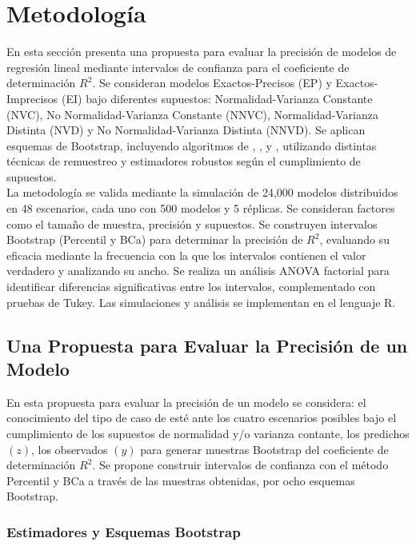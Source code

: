 \section{Metodología}
En esta sección presenta una propuesta para evaluar la precisión de modelos de regresión lineal mediante intervalos de confianza para el coeficiente de determinación \(R^2\). Se consideran modelos Exactos-Precisos (EP) y Exactos-Imprecisos (EI) bajo diferentes supuestos: Normalidad-Varianza Constante (NVC), No Normalidad-Varianza Constante (NNVC), Normalidad-Varianza Distinta (NVD) y No Normalidad-Varianza Distinta (NNVD). Se aplican esquemas de Bootstrap, incluyendo algoritmos de \textcite{wu-1986}, \textcite{liu-1988}, \textcite{zacarias-2023} y \textcite{balam-2012}, utilizando distintas técnicas de remuestreo y estimadores robustos según el cumplimiento de supuestos.\\

La metodología se valida mediante la simulación de 24,000 modelos distribuidos en 48 escenarios, cada uno con 500 modelos y 5 réplicas. Se consideran factores como el tamaño de muestra, precisión y supuestos. Se construyen intervalos Bootstrap (Percentil y BCa) para determinar la precisión de \(R^2\), evaluando su eficacia mediante la frecuencia con la que los intervalos contienen el valor verdadero y analizando su ancho. Se realiza un análisis ANOVA factorial para identificar diferencias significativas entre los intervalos, complementado con pruebas de Tukey. Las simulaciones y análisis se implementan en el lenguaje R.


\subsection{Una Propuesta para Evaluar la Precisión de un Modelo}

En esta propuesta para evaluar la precisión de un modelo se considera: el conocimiento del tipo de caso de esté ante los cuatro escenarios posibles bajo el cumplimiento de los supuestos de normalidad y/o varianza contante, los predichos $(z)$, los observados $(y)$ para generar muestras Bootstrap del coeficiente de determinación $R^{2}$. Se propone construir intervalos de confianza con el método Percentil y BCa a través de las muestras obtenidas, por ocho esquemas Bootstrap. \\ 

\subsubsection{Estimadores y Esquemas Bootstrap}

